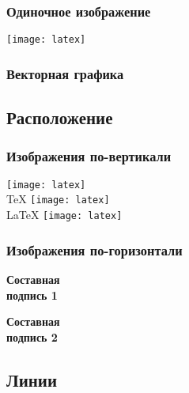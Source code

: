 \begin{frame}
    \frametitle{Одиночное изображение}
    \centering
    \texttt{[image: latex]} %
\end{frame}

\begin{frame}
    \frametitle{Векторная графика}
    \begin{figure}
        \centering
        
    \end{figure}
\end{frame}

\subsection{Расположение}

\begin{frame}
    \frametitle{Изображения по-вертикали}
    \centering
    \vfill
    \texttt{[image: latex]} \\
    \TeX
    \vfill
    \texttt{[image: latex]} \\
    \LaTeX
    \vfill
    \texttt{[image: latex]} \\
    \vfill
\end{frame}


\begin{frame}
    \frametitle{Изображения по-горизонтали}
    \begin{minipage}[t]{0.47\linewidth}
        \textbf{Составная \\ подпись 1}
    \end{minipage}
    \hfill
    \begin{minipage}[t]{0.47\linewidth}
        \textbf{Составная \\ подпись 2}
    \end{minipage}
\end{frame}

\subsection{Линии}

